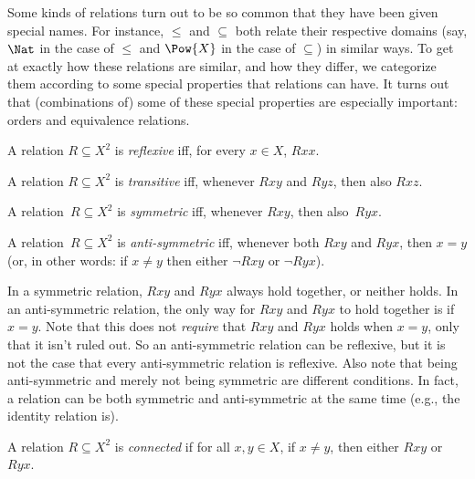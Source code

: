 \documentclass[../../include/open-logic-section]{subfiles}
\begin{document}

\begin{intro}
Some kinds of relations turn out to be so common that they have been
given special names.  For instance, $\le$ and $\subseteq$ both relate
their respective domains (say, $\Nat$ in the case of $\le$ and
$\Pow{X}$ in the case of $\subseteq$) in similar ways.  To get at
exactly how these relations are similar, and how they differ, we
categorize them according to some special properties that relations
can have.  It turns out that (combinations of) some of these special
properties are especially important: orders and equivalence relations.
\end{intro}

\begin{defn}
A relation $R \subseteq X^2$ is \emph{reflexive} iff, for every $x \in
X$, $Rxx$.
\end{defn}

\begin{defn}
A relation $R \subseteq X^2$ is \emph{transitive} iff, whenever $Rxy$
and $Ryz$, then also $Rxz$.
\end{defn}

\begin{defn}
A relation~$R \subseteq X^2$ is \emph{symmetric} iff, whenever 
$Rxy$, then also~$Ryx$.
\end{defn}

\begin{defn}
A relation~$R \subseteq X^2$ is \emph{anti-symmetric} iff, whenever both
$Rxy$ and $Ryx$, then $x=y$ (or, in other words: if $x\neq y$ then
either $\lnot Rxy$ or $\lnot Ryx$).
\end{defn}

\begin{explain}
In a symmetric relation, $Rxy$ and $Ryx$ always hold together, or
neither holds. In an anti-symmetric relation, the only way for $Rxy$
and $Ryx$ to hold together is if $x = y$.  Note that this does not
\emph{require} that $Rxy$ and $Ryx$ holds when $x = y$, only that it
isn't ruled out.  So an anti-symmetric relation can be reflexive, but
it is not the case that every anti-symmetric relation is
reflexive. Also note that being anti-symmetric and merely not being
symmetric are different conditions.  In fact, a relation can be both
symmetric and anti-symmetric at the same time (e.g., the identity
relation is).
\end{explain}

\begin{defn}
A relation $R \subseteq X^2$ is \emph{connected} if for all $x,y\in
X$, if $x \neq y$, then either $Rxy$ or~$Ryx$.
\end{defn}
\end{document}
